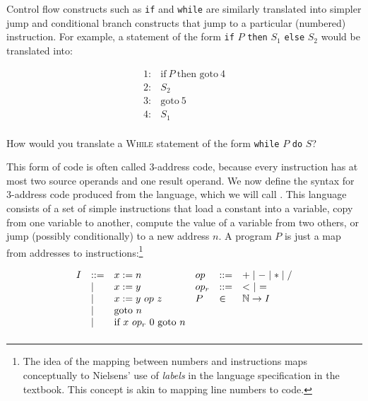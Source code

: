 \documentclass[11pt]{article}
\begin{document}
Control flow constructs such as \texttt{if} and \texttt{while} are similarly
translated into simpler jump and conditional branch constructs
that jump to a particular (numbered) instruction.  For example, a statement of
the form \texttt{if} $P$ \texttt{then} $S_1$ \texttt{else} $S_2$ would be
translated into:

\[
\begin{array}{ll}
1: & \mbox{if}~P~\mbox{then goto}~4\\
2: & S_2\\
3: & \mbox{goto}~5\\
4: & S_1\\
\end{array}
\]

 How would you translate a \textsc{While} statement of the form \texttt{while} $P$ \texttt{do} $S$?

%

\vspace{1em}

This form of code is often called 3-address code, because every instruction has
at most two source operands and one result operand.
%
We now define the syntax for 3-address code produced from the \WhileLang language,
which we will call \WhileThAddr.  This language consists of a set of simple
instructions that load a constant into a variable, copy from one variable to
another, compute the value of a variable from two others, or jump (possibly
conditionally) to a new address $n$.  A program $P$ is just a map from addresses
to instructions:\footnote{The idea of the mapping between numbers and
  instructions maps conceptually to Nielsens' use of \emph{labels} in the
  \WhileLang language specification in the textbook.  This concept is akin to mapping
  line numbers to code.}

\[
\begin{array}{llllll}
I & ::= & x := n & op & ::= & + \mathrel{\mid} - \mathrel{\mid} * \mathrel{\mid} / \\
  & \mathrel{\mid} & x := y & op_r & ::= & <~ \mathrel{\mid} ~=~  \\
  & \mathrel{\mid} & x := y ~op~ z & P & \in & \mathbb{N} \rightarrow I\\
  & \mathrel{\mid} & \mbox{goto}~n \\
  & \mathrel{\mid} & \mbox{if}~x~op_r~0~\mbox{goto}~n \\[1ex]
\end{array}
\]
\end{document}
